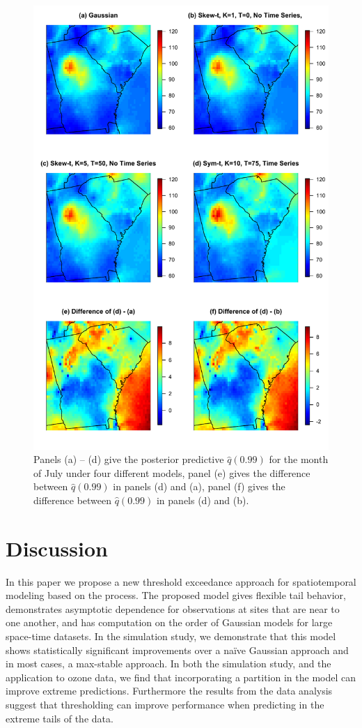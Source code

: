 \documentclass[useAMS,usenatbib,referee]{biom}
\begin{document}
\begin{figure}
  \centering
  \includegraphics[width=0.8\linewidth]{plots/q99-ozone.pdf}
  \caption{Panels (a) -- (d) give the posterior predictive $\widehat{q}(0.99)$ for the month of July under four different models, panel (e) gives the difference between $\widehat{q}(0.99)$ in panels (d) and (a), panel (f) gives the difference between $\widehat{q}(0.99)$ in panels (d) and (b).}
  \label{stfig:ozoneq99}
\end{figure}

\section{Discussion}\label{sts:con}
In this paper we propose a new threshold exceedance approach for spatiotemporal modeling based on the \skewt process.
The proposed model gives flexible tail behavior, demonstrates asymptotic dependence for observations at sites that are near to one another, and has computation on the order of Gaussian models for large space-time datasets.
In the simulation study, we demonstrate that this model shows statistically significant improvements over a na\"{i}ve Gaussian approach and in most cases, a max-stable approach.
In both the simulation study, and the application to ozone data, we find that incorporating a partition in the model can improve extreme predictions.
Furthermore the results from the data analysis suggest that thresholding can improve performance when predicting in the extreme tails of the data.
\end{document}
